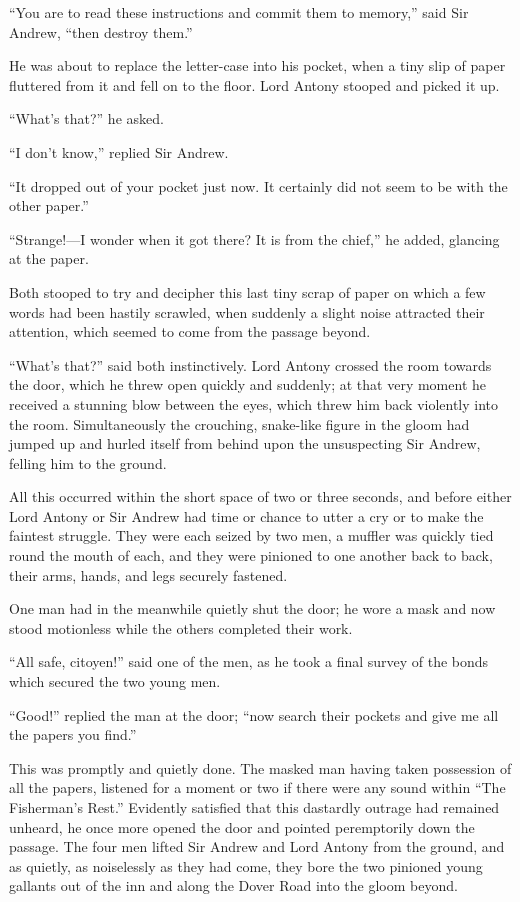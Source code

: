 \documentclass[paper=5.5in:8.5in,BCOR=7mm,twoside,DIV=calc,12pt,usegeometry,chapterprefix,endperiod,headings=big]{scrbook}
\begin{document}
\enquote{You are to read these instructions and commit them to memory,} said Sir Andrew, \enquote{then destroy them.}

He was about to replace the letter-case into his pocket, when a tiny slip of paper fluttered from it and fell on to the floor. Lord Antony stooped and picked it up.

\enquote{What's that?} he asked.

\enquote{I don't know,} replied Sir Andrew.

\enquote{It dropped out of your pocket just now. It certainly did not seem to be with the other paper.}

\enquote{Strange!---I wonder when it got there? It is from the chief,} he added, glancing at the paper.

Both stooped to try and decipher this last tiny scrap of paper on which a few words had been hastily scrawled, when suddenly a slight noise attracted their attention, which seemed to come from the passage beyond.

\enquote{What's that?} said both instinctively. Lord Antony crossed the room towards the door, which he threw open quickly and suddenly; at that very moment he received a stunning blow between the eyes, which threw him back violently into the room. Simultaneously the crouching, snake-like figure in the gloom had jumped up and hurled itself from behind upon the unsuspecting Sir Andrew, felling him to the ground.

All this occurred within the short space of two or three seconds, and before either Lord Antony or Sir Andrew had time or chance to utter a cry or to make the faintest struggle. They were each seized by two men, a muffler was quickly tied round the mouth of each, and they were pinioned to one another back to back, their arms, hands, and legs securely fastened.

One man had in the meanwhile quietly shut the door; he wore a mask and now stood motionless while the others completed their work.

\enquote{All safe, citoyen!} said one of the men, as he took a final survey of the bonds which secured the two young men.

\enquote{Good!} replied the man at the door; \enquote{now search their pockets and give me all the papers you find.}

This was promptly and quietly done. The masked man having taken possession of all the papers, listened for a moment or two if there were any sound within \enquote{The Fisherman's Rest.} Evidently satisfied that this dastardly outrage had remained unheard, he once more opened the door and pointed peremptorily down the passage. The four men lifted Sir Andrew and Lord Antony from the ground, and as quietly, as noiselessly as they had come, they bore the two pinioned young gallants out of the inn and along the Dover Road into the gloom beyond.
\end{document}
